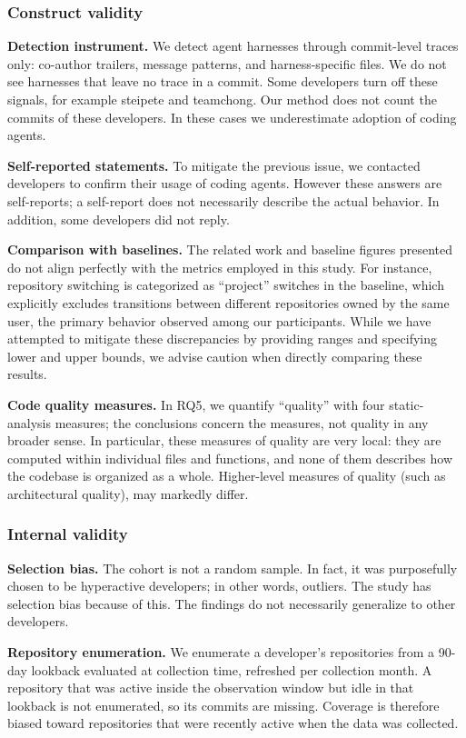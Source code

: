 \documentclass[smallextended]{svjour3}
\begin{document}
\subsubsection{Construct validity}
\textbf{Detection instrument.} We detect agent harnesses through commit-level traces only: co-author trailers, message patterns, and harness-specific files. We do not see harnesses that leave no trace in a commit. Some developers turn off these signals, for example steipete and teamchong. Our method does not count the commits of these developers. In these cases we underestimate adoption of coding agents.

\textbf{Self-reported statements.} To mitigate the previous issue, we contacted developers to confirm their usage of coding agents. However these answers are self-reports; a self-report does not necessarily describe the actual behavior. In addition, some developers did not reply.

\textbf{Comparison with baselines.} The related work and baseline figures presented do not align perfectly with the metrics employed in this study. For instance, repository switching is categorized as ``project'' switches in the baseline, which explicitly excludes transitions between different repositories owned by the same user, the primary behavior observed among our participants. While we have attempted to mitigate these discrepancies by providing ranges and specifying lower and upper bounds, we advise caution when directly comparing these results.

\textbf{Code quality measures.} In RQ5, we quantify ``quality'' with four static-analysis measures; the conclusions concern the measures, not quality in any broader sense. In particular, these measures of quality are very local: they are computed within individual files and functions, and none of them describes how the codebase is organized as a whole. Higher-level measures of quality (such as architectural quality), may markedly differ.


\subsubsection{Internal validity}
\textbf{Selection bias.} The cohort is not a random sample. In fact, it was purposefully chosen to be hyperactive developers; in other words, outliers. The study has selection bias because of this. The findings do not necessarily generalize to other developers.

\textbf{Repository enumeration.} We enumerate a developer's repositories from a 90-day lookback evaluated at collection time, refreshed per collection month. A repository that was active inside the observation window but idle in that lookback is not enumerated, so its commits are missing. Coverage is therefore biased toward repositories that were recently active when the data was collected.
\end{document}
